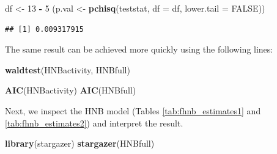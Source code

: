 \documentclass[10pt,]{scrartcl}
\newenvironment{Shaded}{\begin{snugshade}}{\end{snugshade}}
\newcommand{\KeywordTok}[1]{\textcolor[rgb]{0.13,0.29,0.53}{\textbf{#1}}}
\newcommand{\DataTypeTok}[1]{\textcolor[rgb]{0.13,0.29,0.53}{#1}}
\newcommand{\DecValTok}[1]{\textcolor[rgb]{0.00,0.00,0.81}{#1}}
\newcommand{\StringTok}[1]{\textcolor[rgb]{0.31,0.60,0.02}{#1}}
\newcommand{\OtherTok}[1]{\textcolor[rgb]{0.56,0.35,0.01}{#1}}
\newcommand{\OperatorTok}[1]{\textcolor[rgb]{0.81,0.36,0.00}{\textbf{#1}}}
\newcommand{\NormalTok}[1]{#1}
\begin{document}
\begin{Shaded}
\begin{Highlighting}[]
\NormalTok{df <-}\StringTok{ }\DecValTok{13} \OperatorTok{-}\StringTok{ }\DecValTok{5}
\NormalTok{(p.val <-}\StringTok{ }\KeywordTok{pchisq}\NormalTok{(teststat, }\DataTypeTok{df =}\NormalTok{ df, }\DataTypeTok{lower.tail =} \OtherTok{FALSE}\NormalTok{))}
\end{Highlighting}
\end{Shaded}

\begin{verbatim}
## [1] 0.009317915
\end{verbatim}

\normalsize

The same result can be achieved more quickly using the following lines:

\footnotesize

\begin{Shaded}
\begin{Highlighting}[]
\KeywordTok{waldtest}\NormalTok{(HNBactivity, HNBfull)}
\end{Highlighting}
\end{Shaded}

\begin{Shaded}
\begin{Highlighting}[]
\KeywordTok{AIC}\NormalTok{(HNBactivity)}
\KeywordTok{AIC}\NormalTok{(HNBfull)}
\end{Highlighting}
\end{Shaded}

\normalsize

Next, we inspect the HNB model (Tables \ref{tab:fhnb_estimates1} and
\ref{tab:fhnb_estimates2}) and interpret the result.

\footnotesize

\begin{Shaded}
\begin{Highlighting}[]
\KeywordTok{library}\NormalTok{(stargazer)}
\KeywordTok{stargazer}\NormalTok{(HNBfull)}
\end{Highlighting}
\end{Shaded}

\normalsize 
\end{document}
